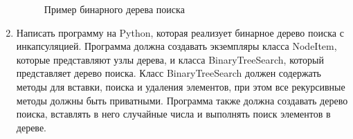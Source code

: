 \begin{enumerate}
\begin{figure}[h]
\centering
{}
\caption{Пример бинарного дерева поиска}
\end{figure}

\item Написать программу на Python, которая реализует бинарное дерево поиска с инкапсуляцией. Программа должна создавать экземпляры класса NodeItem, которые представляют узлы дерева, и класса BinaryTreeSearch, который представляет дерево поиска. Класс BinaryTreeSearch должен содержать методы для вставки, поиска и удаления элементов, при этом все рекурсивные методы должны быть приватными. Программа также должна создавать дерево поиска, вставлять в него случайные числа и выполнять поиск элементов в дереве.


\end{enumerate}
